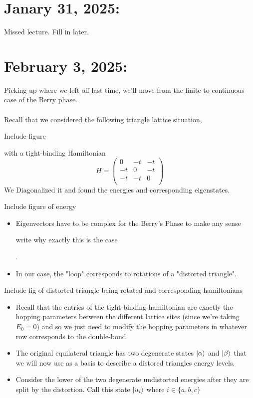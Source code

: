\documentclass[11pt]{article}
\begin{document}
\section{Janary 31, 2025:}

Missed lecture. Fill in later.

\pagebreak
\section{February 3, 2025:}

Picking up where we left off last time, we'll move from the finite to continuous case of the Berry phase.
\\
\\
Recall that we considered the following triangle lattice situation, 
\begin{center}
  Include figure
\end{center} with a tight-binding Hamiltonian $$ H = \begin{pmatrix}
  0 & -t & -t \\
  -t & 0 & -t \\
  -t & -t & 0 \\
\end{pmatrix} $$ We Diagonalized it and found the energies and corresponding eigenstates.
\begin{center}
  Include figure of energy
\end{center} 
\begin{itemize}
  \item Eigenvectors have to be complex for the Berry's Phase to make any sense \begin{note}{write why exactly this is the case}\end{note}.
  \item In our case, the "loop" corresponds to rotations of a "distorted triangle".
\end{itemize}
\begin{center}
  Include fig of distorted triangle being rotated and corresponding hamiltonians
\end{center} 
\begin{itemize}
  \item Recall that the entries of the tight-binding hamiltonian are exactly the hopping parameters between the different lattice sites (since we're taking $E_0 = 0$) and so we just need to modify the hopping parameters in whatever row corresponds to the double-bond.
  
  \item The original equilateral triangle has two degenerate states $\lvert\alpha\rangle$ and $\lvert\beta\rangle$ that we will now use as a basis to describe a distored triangles energy levels.
  
  \item Consider the lower of the two degenerate undistorted energies after they are split by the distortion. Call this state $\lvert u_{i}\rangle$ where $i \in \{a,b,c\}$
\end{itemize}
\end{document}
